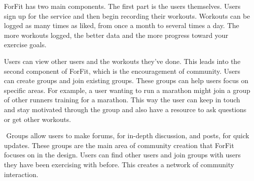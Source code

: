 ForFit has two main components. The first part is the users themselves. Users sign up for the service and then begin recording their workouts. Workouts can be logged as many times as liked, from once a month to several times a day. The more workouts logged, the better data and the more progress toward your exercise goals. 
 

Users can view other users and the workouts they've done. This leads into the second component of ForFit, which is the encouragement of community. Users can create groups and join existing groups. These groups can help users focus on specific areas. For example, a user wanting to run a marathon might join a group of other runners training for a marathon. This way the user can keep in touch and stay motivated through the group and also have a resource to ask questions or get other workouts. 

 Groups allow users to make forums, for in-depth discussion, and posts, for quick updates. These groups are the main area of community creation that ForFit focuses on in the design. Users can find other users and join groups with users they have been exercising with before. This creates a network of community interaction.